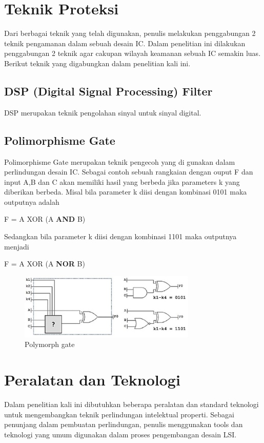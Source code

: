 \section{Teknik Proteksi}
Dari berbagai teknik yang telah digunakan, penulis melakukan penggabungan 2 teknik pengamanan dalam sebuah desain IC. Dalam penelitian ini dilakukan penggabungan 2 teknik agar cakupan wilayah keamanan sebuah IC semakin luas. Berikut teknik yang digabungkan dalam penelitian kali ini.

\subsection{DSP (Digital Signal Processing) Filter}
DSP merupakan teknik pengolahan sinyal untuk sinyal digital.

\subsection{Polimorphisme Gate}
Polimorphisme Gate merupakan teknik pengecoh yang di gunakan dalam perlindungan desain IC. Sebagai contoh sebuah rangkaian dengan ouput F dan input A,B dan C akan memiliki hasil yang berbeda jika parameters k yang diberikan berbeda. Misal bila parameter k diisi dengan kombinasi 0101 maka outputnya adalah
\begin{center}
	F = A XOR (A \textbf{AND} B)
\end{center}
Sedangkan bila parameter k diisi dengan kombinasi 1101 maka outputnya menjadi
\begin{center}
	F = A XOR (A \textbf{NOR} B)
\end{center}

\begin{figure}
	\centering
	\includegraphics[width=0.75\textwidth]
	{pics/polymorphgate.png}
	\caption{Polymorph gate}
	\label{fig:poly}
\end{figure}

\section{Peralatan dan Teknologi}
Dalam penelitian kali ini dibutuhkan beberapa peralatan dan standard teknologi untuk mengembangkan teknik perlindungan intelektual properti. Sebagai penunjang dalam pembuatan perlindungan, penulis menggunakan tools dan teknologi yang umum digunakan dalam proses pengembangan desain LSI.

